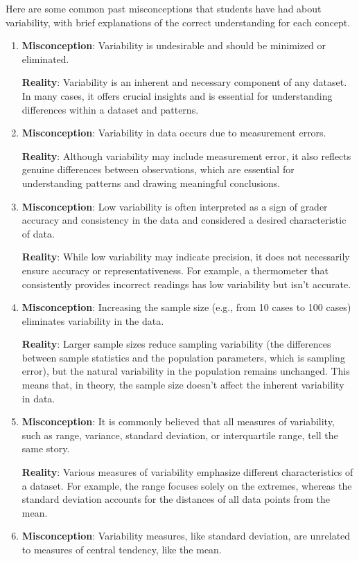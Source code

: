 \documentclass[
  letterpaper,
  DIV=11,
  numbers=noendperiod]{scrreprt}
\begin{document}
Here are some common past misconceptions that students have had about
variability, with brief explanations of the correct understanding for
each concept.

\begin{enumerate}
\def\labelenumi{\arabic{enumi}.}
\item
  \textbf{Misconception}: Variability is undesirable and should be
  minimized or eliminated.

  \textbf{Reality}: Variability is an inherent and necessary component
  of any dataset. In many cases, it offers crucial insights and is
  essential for understanding differences within a dataset and patterns.
\item
  \textbf{Misconception}: Variability in data occurs due to measurement
  errors.

  \textbf{Reality}: Although variability may include measurement error,
  it also reflects genuine differences between observations, which are
  essential for understanding patterns and drawing meaningful
  conclusions.
\item
  \textbf{Misconception}: Low variability is often interpreted as a sign
  of grader accuracy and consistency in the data and considered a
  desired characteristic of data.

  \textbf{Reality}: While low variability may indicate precision, it
  does not necessarily ensure accuracy or representativeness. For
  example, a thermometer that consistently provides incorrect readings
  has low variability but isn't accurate.
\item
  \textbf{Misconception}: Increasing the sample size (e.g., from 10
  cases to 100 cases) eliminates variability in the data.

  \textbf{Reality}: Larger sample sizes reduce sampling variability (the
  differences between sample statistics and the population parameters,
  which is sampling error), but the natural variability in the
  population remains unchanged. This means that, in theory, the sample
  size doesn't affect the inherent variability in data.
\item
  \textbf{Misconception}: It is commonly believed that all measures of
  variability, such as range, variance, standard deviation, or
  interquartile range, tell the same story.

  \textbf{Reality}: Various measures of variability emphasize different
  characteristics of a dataset. For example, the range focuses solely on
  the extremes, whereas the standard deviation accounts for the
  distances of all data points from the mean.
\item
  \textbf{Misconception}: Variability measures, like standard deviation,
  are unrelated to measures of central tendency, like the mean.


\end{enumerate}
\end{document}
